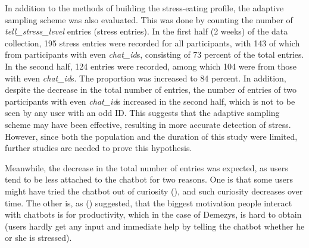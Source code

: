 \bigskip
In addition to the methods of building the stress-eating profile, the adaptive sampling scheme was also evaluated. This was done by counting the number of \emph{tell\_stress\_level} entries (stress entries). In the first half (2 weeks) of the data collection, 195 stress entries were recorded for all participants, with 143 of which from participants with even \emph{chat\_id}s, consisting of 73 percent of the total entries. In the second half, 124 entries were recorded, among which 104 were from those with even \emph{chat\_id}s. The proportion was increased to 84 percent. In addition, despite the decrease in the total number of entries, the number of entries of two participants with even \emph{chat\_id}s increased in the second half, which is not to be seen by any user with an odd ID. This suggests that the adaptive sampling scheme may have been effective, resulting in more accurate detection of stress. However, since both the population and the duration of this study were limited, further studies are needed to prove this hypothesis.

Meanwhile, the decrease in the total number of entries was expected, as users tend to be less attached to the chatbot for two reasons. One is that some users might have tried the chatbot out of curiosity (\cite{47_curiosity}), and such curiosity decreases over time. The other is, as \citeauthor{48_why_chatbot} (\citeyear{48_why_chatbot}) suggested, that the biggest motivation people interact with chatbots is for productivity, which in the case of Demezys, is hard to obtain (users hardly get any input and immediate help by telling the chatbot whether he or she is stressed).
